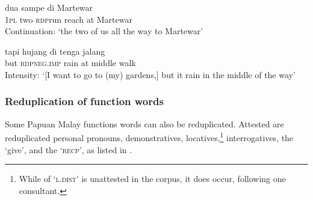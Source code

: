 \ea
\label{Example_4.4}
 {dua} {} {sampe} {di} {Martewar}\\ %
 \textsc{1pl}  two  \textsc{rdp}{\Tilde}run  reach  at  Martewar\\
\glt 
Continuation: ‘the two of us  all the way to Martewar’ \textstyleExampleSource{[080923-010-CvNP.0009]}
\z

\ea
\label{Example_4.5}
\gll {\ldots} {tapi} {} {hujang} {di} {tenga} {jalang}\\ %
 { }   but  \textsc{rdp}{\Tilde}\textsc{neg.imp}  {rain}  {at}  {middle}  {walk}\\

\glt
Intensity: ‘[I want to go to (my) gardens,] but  it  rain in the middle of the way’ \textstyleExampleSource{[Elicited BR120813.031]}
\z


\newpage 
\subsubsection[Reduplication of function words]{Reduplication of function words}\label{Para_4.1.1.2}
\label{bkm:Ref339284928}
Some Papuan Malay functions words can also be reduplicated. Attested are reduplicated personal pronouns, demonstratives, locatives,\footnote{While  of  ‘\textsc{l.dist}’ is unattested in the corpus, it does occur, following one consultant.} interrogatives, the    ‘give’, and the   ‘\textsc{recp}’, as listed in .



